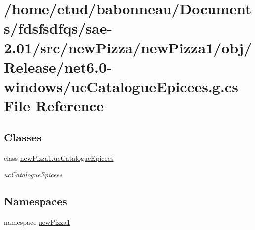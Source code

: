 \hypertarget{Release_2net6_80-windows_2ucCatalogueEpicees_8g_8cs}{}\section{/home/etud/babonneau/\+Documents/fdsfsdfqs/sae-\/2.01/src/new\+Pizza/new\+Pizza1/obj/\+Release/net6.0-\/windows/uc\+Catalogue\+Epicees.g.\+cs File Reference}
\label{Release_2net6_80-windows_2ucCatalogueEpicees_8g_8cs}
\subsection*{Classes}
\begin{DoxyCompactItemize}
\item 
class \hyperlink{classnewPizza1_1_1ucCatalogueEpicees}{new\+Pizza1.\+uc\+Catalogue\+Epicees}
\begin{DoxyCompactList}\small\item\em \hyperlink{classnewPizza1_1_1ucCatalogueEpicees}{uc\+Catalogue\+Epicees} \end{DoxyCompactList}\end{DoxyCompactItemize}
\subsection*{Namespaces}
\begin{DoxyCompactItemize}
\item 
namespace \hyperlink{namespacenewPizza1}{new\+Pizza1}
\end{DoxyCompactItemize}
